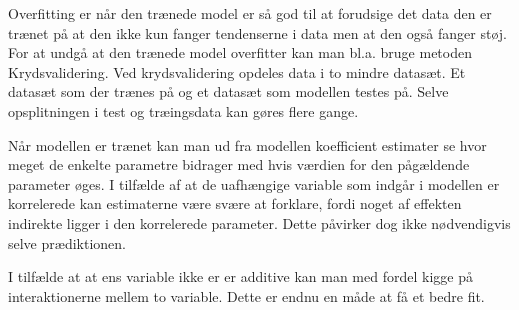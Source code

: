 \documentclass{report}
\begin{document}
Overfitting er når den trænede model er så god til at forudsige det data den er trænet på at den ikke kun fanger tendenserne i data men at den også fanger støj. For at undgå at den trænede model overfitter kan man bl.a. bruge metoden Krydsvalidering. Ved krydsvalidering opdeles data i to mindre datasæt. Et datasæt som der trænes på og et datasæt som modellen testes på. Selve opsplitningen i test og træingsdata kan gøres flere gange.

Når modellen er trænet kan man ud fra modellen koefficient estimater se hvor meget de enkelte parametre bidrager med hvis værdien for den pågældende parameter øges. 
I tilfælde af at de uafhængige variable som indgår i modellen er korrelerede kan estimaterne være svære at forklare, fordi noget af effekten indirekte ligger i den korrelerede parameter. Dette påvirker dog ikke nødvendigvis selve prædiktionen. 

I tilfælde at at ens variable ikke er er additive kan man med fordel kigge på interaktionerne mellem to variable. Dette er endnu en måde at få et bedre fit.
\end{document}
